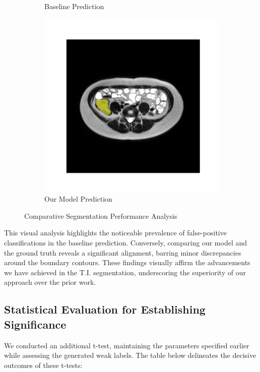 \begin{figure}[htp]
\begin{subfigure}[b]{0.47\textwidth}
\caption{Baseline Prediction}
\label{fig:baseline-pred}
\end{subfigure}
\hfill
\begin{subfigure}[b]{0.47\textwidth}
\centering
\includegraphics[width=\textwidth]{./figures/seg_medsam.png}
\caption{Our Model Prediction}
\label{fig:medsam-pred}
\end{subfigure}
\caption{Comparative Segmentation Performance Analysis}
\label{fig:comparison-pred}
\end{figure}

This visual analysis highlights the noticeable prevalence of false-positive classifications in the baseline prediction. Conversely, comparing our model and the ground truth reveals a significant alignment, barring minor discrepancies around the boundary contours. These findings visually affirm the advancements we have achieved in the T.I. segmentation, underscoring the superiority of our approach over the prior work.

\subsection{Statistical Evaluation for Establishing Significance}
We conducted an additional t-test, maintaining the parameters specified earlier while assessing the generated weak labels. The table below delineates the decisive outcomes of these t-tests:


